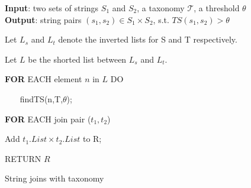 




\begin{algorithm}
{\bf Input}: two sets of strings $S_1$ and $S_2$, a taxonomy $\mathcal{T}$, a threshold $\theta$ \\
{\bf Output}: string pairs $(s_1,s_2) \in S_1 \times S_2$, s.t. $TS(s_1, s_2) > \theta$
\begin{compactenum}[(1)]
\item Let $L_s$ and $L_t$ denote the inverted lists for S and T respectively.
\item Let $L$ be the shorted list between $L_s$ and $L_t$.
\item {\bf FOR} EACH element $n$ in $L$ DO
\item ~~~ findTS(n,T,$\theta$);
\item {\bf FOR} EACH join pair ($t_1,t_2$)
\item  Add $t_1.List \times t_2.List$ to R;
\item RETURN $R$
\end{compactenum}
\caption{String joins with taxonomy}
\label{alg:exactjoin}
\end{algorithm}


